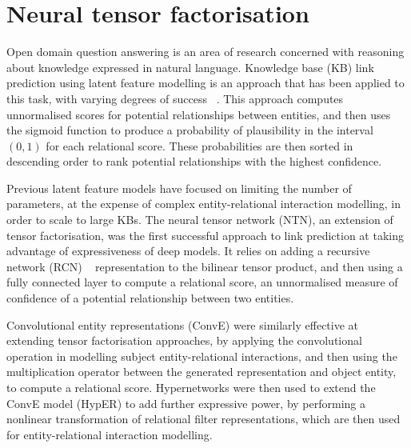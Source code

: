 \chapter{Neural tensor factorisation}


\ifpdf
    \graphicspath{{Chapter3/Figs/Raster/}{Chapter3/Figs/PDF/}{Chapter3/Figs/}}
\else
    \graphicspath{{Chapter3/Figs/Vector/}{Chapter3/Figs/}}
\fi


Open domain question answering is an area of research concerned with reasoning about knowledge expressed in natural language. Knowledge base (KB) link prediction using latent feature modelling is an approach that has been applied to this task, with varying degrees of success  \unskip ~\citep{nguyen2017novel, diefenbach2018wdaqua, kristiadi2019incorporating}. This approach computes unnormalised scores for potential relationships between entities, and then uses the sigmoid function to produce a probability of plausibility in the interval $ (0, 1)$ for each relational score. These probabilities are then sorted in descending order to rank potential relationships with the highest confidence. \par

\noindent Previous latent feature models have focused on limiting the number of parameters, at the expense of complex entity-relational interaction modelling, in order to scale to large KBs. The neural tensor network (NTN), an extension of tensor factorisation, was the first successful approach to link prediction at taking advantage of expressiveness of deep models. It relies on adding a recursive network (RCN) \unskip ~\citep{pollack1990recursive} representation to the bilinear tensor product, and then using a fully connected layer to compute a relational score, an unnormalised measure of confidence of a potential relationship between two entities. \par

\noindent Convolutional entity representations (ConvE) were similarly effective at extending tensor factorisation approaches, by applying the convolutional operation in modelling subject entity-relational interactions, and then using the multiplication operator between the generated representation and object entity, to compute a relational score. Hypernetworks were then used to extend the ConvE model (HypER) to add further expressive power, by performing a nonlinear transformation of relational filter representations, which are then used for entity-relational interaction modelling. \newpage

